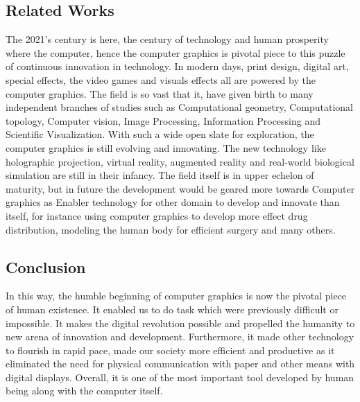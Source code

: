 \documentclass{report}
\begin{document}
\subsection{Related Works}
The 2021's century is here, the century of technology and human prosperity where the computer, hence the computer graphics is
pivotal piece to this puzzle of continuous innovation in technology. In modern days, print design, digital art, special effects, the video games
and visuals effects all are powered by the computer graphics. The field is so vast that it, have given birth to many independent branches
of studies such as Computational geometry, Computational topology, Computer vision, Image Processing,  Information Processing and Scientific Visualization.
With such a wide open  slate for exploration, the computer graphics is still evolving and innovating. The new technology like
holographic projection, virtual reality, augmented reality and real-world biological simulation are still in their infancy.
The field itself is in upper echelon of maturity, but in future the development would be geared more towards Computer graphics as
Enabler technology for other domain to develop and innovate than itself, for instance using computer graphics to develop more effect drug distribution,
modeling the human body for efficient surgery and many others.

\subsection{Conclusion}

In this way, the humble beginning of computer graphics is now the pivotal piece of human existence. It enabled
us to do task which were previously difficult or impossible. It makes the digital revolution possible and propelled the humanity to new
arena of innovation and development. Furthermore, it made other technology to flourish in rapid pace, made our society more efficient and productive as it
eliminated the need for physical communication with paper and other means with digital displays.
Overall, it is one of the most important tool developed by human being along with the computer itself.
\end{document}
